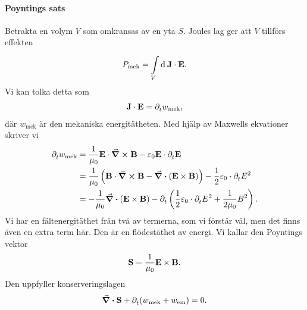 \paragraph{Poyntings sats}
Betrakta en volym $V$ som omkransas av en yta $S$. Joules lag ger att $V$ tillförs effekten
\begin{align*}
	P_{\text{mek}} = \int\limits_{V}^{}\dd[]{}\vb{J}\cdot\vb{E}.
\end{align*}
Vi kan tolka detta som
\begin{align*}
	\vb{J}\cdot\vb{E} = \partial_{t}^{}w_{\text{mek}},
\end{align*}
där $w_{\text{mek}}$ är den mekaniska energitätheten. Med hjälp av Maxwells ekvationer skriver vi
\begin{align*}
	\partial_{t}^{}w_{\text{mek}} &= \frac{1}{\mu_{0}}\vb{E}\cdot\curl{\vb{B}} - \varepsilon_{0}\vb{E}\cdot\partial_{t}^{}\vb{E} \\
	                        &= \frac{1}{\mu_{0}}\left(\vb{B}\cdot\curl{\vb{B}} - \div(\vb{E}\times\vb{B})\right) - \frac{1}{2}\varepsilon_{0}\cdot\partial_{t}^{}E^{2} \\
	                        &= -\frac{1}{\mu_{0}}\div(\vb{E}\times\vb{B}) - \partial_{t}^{}\left(\frac{1}{2}\varepsilon_{0}\cdot\partial_{t}^{}E^{2} + \frac{1}{2\mu_{0}}B^{2}\right).
\end{align*}
Vi har en fältenergitäthet från två av termerna, som vi förstår väl, men det finns även en extra term här. Den är en flödestäthet av energi. Vi kallar den Poyntings vektor
\begin{align*}
	\vb{S} = \frac{1}{\mu_{0}}\vb{E}\times\vb{B}.
\end{align*}
Den uppfyller konserveringslagen
\begin{align*}
	\div{\vb{S}} + \partial_{t}^{}(w_{\text{mek}} + w_{\text{em}}) = 0.
\end{align*}

